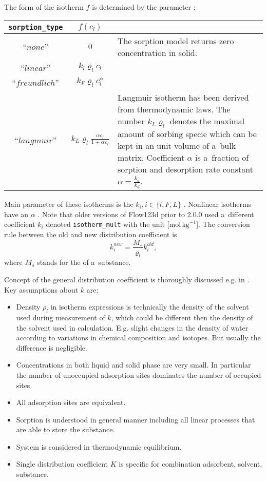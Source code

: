 The form of the isotherm $f$ is determined by the parameter :
\begin{center}
\def\arraystretch{2}
\begin{tabular}{|c|c|p{8cm}|}
\hline
\texttt{sorption\_type} & $f(c_l)$ & \\\hline
``$none$'' & $0$ & The sorption model returns zero concentration in solid.\\\hline
``$linear$'' & $k_l\varrho_l c_l$ &\\\hline
``$freundlich$'' & $k_F \varrho_l c_l^{\alpha}$ &\\\hline
``$langmuir$'' & $k_L \varrho_l \frac{\alpha c_l}{1 + \alpha c_l}$ &
       Langmuir isotherm has been derived from thermodynamic laws. The number $k_L\varrho_l$ denotes the maximal amount 
       of sorbing specie which can be kept in an unit volume of a~bulk matrix. Coefficient $\alpha$ is 
       a~fraction of sorption and desorption rate constant $\alpha = \frac{k_a}{k_d}$.\\\hline
\end{tabular}
\end{center}
Main parameter of these isotherms is the  $k_i, i\in\{ l,F,L\}$ .
Nonlinear isotherms have an  $\alpha$ \units{}{}{}.
Note that older versions of Flow123d prior to 2.0.0 used a~different coefficient $k_i$ denoted \texttt{isotherm\_mult} with the unit [mol$\,\mathrm{kg}^{-1}$].
The conversion rule between the old and new distribution coefficient is
\[ k_i^{new} = \frac{M_s}{\varrho_l} k_i^{old}, \]
where $M_s$ stands for the  of a~substance.

Concept of the general distribution coefficient is thoroughly discussed e.g. in \cite{ORIA1999}. Key assumptions about $k$ are:
\begin{itemize}
 \item Density $\rho_l$ in isotherm expressions is technically the density of the solvent used during measurement of $k$, 
 which could be different then the density of the solvent used in calculation.
 E.g. slight changes in the density of water according to variations in chemical composition and isotopes. But usually the difference is negligible. 
 \item Concentrations in both liquid and solid phase are very small. In particular the number of unoccupied adsorption sites 
 dominates the number of occupied sites. 
 \item All adsorption sites are equivalent.
 \item Sorption is understood in general manner including all linear processes that are able to store the substance.
 \item System is considered in thermodynamic equilibrium.
 \item Single distribution coefficient $K$ is specific for combination adsorbent, solvent, substance.
\end{itemize}


